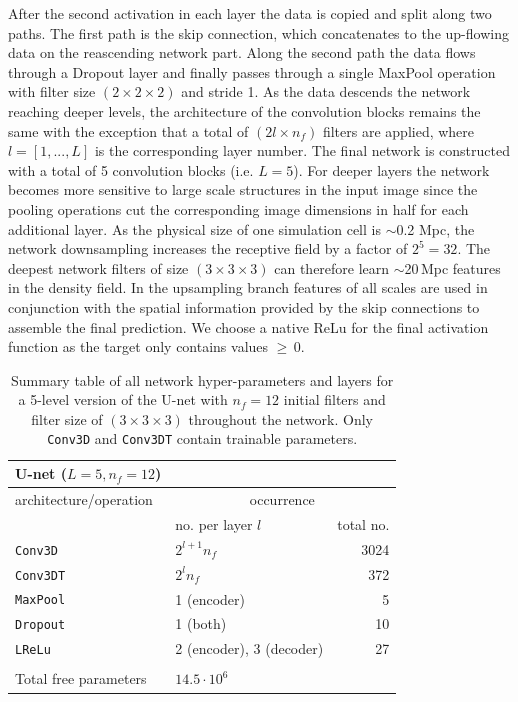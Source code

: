 \documentclass[fleqn,usenatbib]{mnras}
\begin{document}
After the second activation in each layer the data is copied and split along two paths. The first path is the skip connection, which concatenates to the up-flowing data on the reascending network part. Along the second path the data flows through a Dropout layer \citep{Srivastava2014} and finally passes through a single MaxPool operation with filter size $(2\times 2\times 2)$ and stride 1. As the data descends the network reaching deeper levels, the architecture of the convolution blocks remains the same with the exception that a total of $(2l\times n_{f})$ filters are applied, where $l=[1,...,L]$ is the corresponding layer number. The final network is constructed with a total of 5 convolution blocks (i.e. $L=5$). For deeper layers the network becomes more sensitive to large scale structures in the input image since the pooling operations cut the corresponding image dimensions in half for each additional layer. As the physical size of one simulation cell is $\sim$0.2 Mpc, the network downsampling increases the receptive field by a factor of $2^{5}=32$. The deepest network filters of size $(3\times 3\times 3)$ can therefore learn $\sim$20\,Mpc features in the density field. In the upsampling branch features of all scales are used in conjunction with the spatial information provided by the skip connections to assemble the final prediction. We choose a native ReLu for the final activation function as the target only contains values $\geq\,$0.
\begin{table}
	\begin{tabular}{llr}
    U-net ($L=5, n_{f}=12$)                 &                          & \multicolumn{1}{l}{} \\ \hline
    architecture/operation & \multicolumn{2}{c}{occurrence}                  \\ \hline
                           & no. per layer $l$           & total no.            \\
    \texttt{Conv3D}                 & $2^{l+1}n_{f}$                   & 3024                    \\
    \texttt{Conv3DT}                & $2^{l}n_{f}$                       & 372                    \\
    \texttt{MaxPool}                & 1 (encoder)              & 5                    \\
    \texttt{Dropout}                & 1 (both)                 & 10                    \\
    \texttt{LReLu}                  & 2 (encoder), 3 (decoder) & 27                    \\
                           &                          & \multicolumn{1}{l}{} \\
    Total free parameters  & $14.5 \cdot 10^{6}$                        & \multicolumn{1}{l}{} \\ \hline
    \end{tabular}
	\caption{Summary table of all network hyper-parameters and layers for a 5-level version of the U-net with $n_{f}=12$ initial filters and filter size of $(3\times 3\times 3)$ throughout the network. Only \texttt{Conv3D} and \texttt{Conv3DT} contain trainable parameters.}
\end{table}
\end{document}
